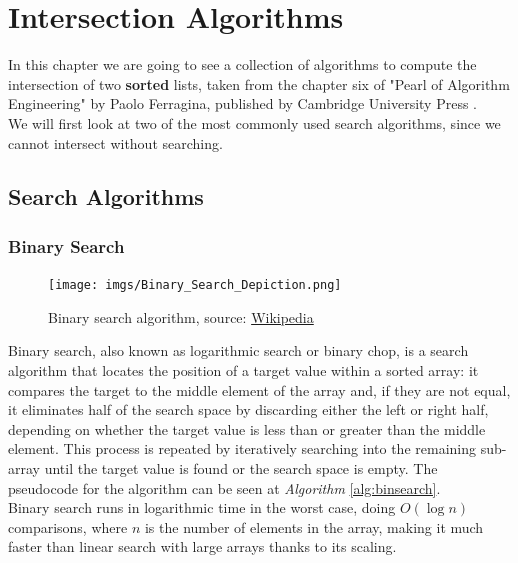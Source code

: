 \chapter{Intersection Algorithms\label{intersect}}

In this chapter we are going to see a collection of algorithms to compute the intersection of two \textbf{sorted} lists, taken from the chapter six of "Pearl of Algorithm Engineering" by Paolo Ferragina, published by Cambridge University Press \citep{Ferragina_2023}. \\
We will first look at two of the most commonly used search algorithms, since we cannot intersect without searching. 

\section{Search Algorithms}

\subsection{Binary Search \label{sec:binsearch}}

\begin{figure}[H] 
    \begin{center}
        \texttt{[image: imgs/Binary\_Search\_Depiction.png]}
        \caption{Binary search algorithm, source: \href{https://en.wikipedia.org/wiki/Binary_search}{Wikipedia}\label{fig:binsearch}}
    \end{center}
\end{figure}

Binary search, also known as logarithmic search or binary chop, is a search algorithm that locates the position of a target value within a sorted array: it compares the target to the middle element of the array and, if they are not equal, it eliminates half of the search space by discarding either the left or right half, depending on whether the target value is less than or greater than the middle element. This process is repeated by iteratively searching into the remaining sub-array until the target value is found or the search space is empty. The pseudocode for the algorithm can be seen at \textit{Algorithm} \ref{alg:binsearch}.\\
Binary search runs in logarithmic time in the worst case, doing $O(\log n)$ comparisons, where $n$ is the number of elements in the array, making it much faster than linear search with large arrays thanks to its scaling.

